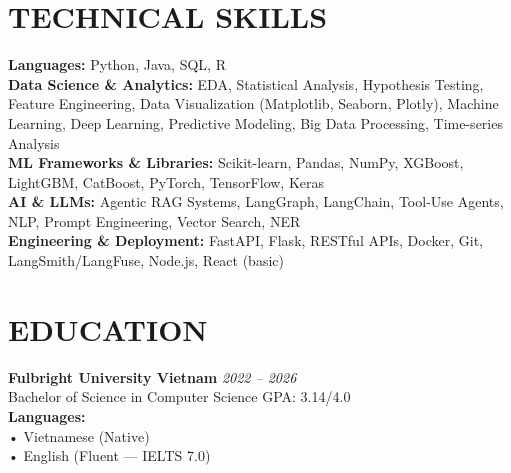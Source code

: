 \documentclass[10pt, letterpaper]{article}
\begin{document}
\vspace{8pt}

\section{TECHNICAL SKILLS}

\noindent
\textbf{Languages:} Python, Java, SQL, R\\[3pt]
\textbf{Data Science \& Analytics:} EDA, Statistical Analysis, Hypothesis Testing, Feature Engineering, Data Visualization (Matplotlib, Seaborn, Plotly), Machine Learning, Deep Learning, Predictive Modeling, Big Data Processing, Time-series Analysis\\[3pt]
\textbf{ML Frameworks \& Libraries:} Scikit-learn, Pandas, NumPy, XGBoost, LightGBM, CatBoost, PyTorch, TensorFlow, Keras\\[3pt]
\textbf{AI \& LLMs:} Agentic RAG Systems, LangGraph, LangChain, Tool-Use Agents, NLP, Prompt Engineering, Vector Search, NER\\[3pt]
\textbf{Engineering \& Deployment:} FastAPI, Flask, RESTful APIs, Docker, Git, LangSmith/LangFuse, Node.js, React (basic)

\vspace{8pt}

\section{EDUCATION}

\noindent
\textbf{Fulbright University Vietnam} \hfill \textit{2022 – 2026}\\
Bachelor of Science in Computer Science \hfill GPA: 3.14/4.0\\[3pt]

\noindent
\textbf{Languages:}\\
• Vietnamese (Native)\\
• English (Fluent --- IELTS 7.0)
\end{document}
